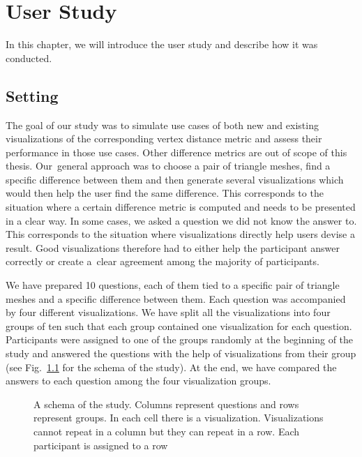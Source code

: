 \chapter{User Study}
\label{chap:user_study}

In this chapter, we will introduce the user study and describe how it was conducted.

\section{Setting}
\label{sec:user_study-setting}

The goal of our study was to simulate use cases of both new and existing visualizations of the corresponding vertex distance metric and assess their performance in those use cases. Other difference metrics are out of scope of this thesis. Our~general approach was to choose a pair of triangle meshes, find a specific difference between them and then generate several visualizations which would then help the user find the same difference. This corresponds to the situation where a certain difference metric is computed and needs to be presented in a clear way. In some cases, we asked a question we did not know the answer to. This corresponds to the situation where visualizations directly help users devise a result. Good visualizations therefore had to either help the participant answer correctly or create a~clear agreement among the majority of participants.

We have prepared 10 questions, each of them tied to a specific pair of triangle meshes and a specific difference between them. Each question was accompanied by four different visualizations. We have split all the visualizations into four groups of ten such that each group contained one visualization for each question. Participants were assigned to one of the groups randomly at the beginning of the study and answered the questions with the help of visualizations from their group (see Fig.~\ref{fig:illustration-study_setting} for the schema of the study). At the end, we have compared the answers to each question among the four visualization groups.

\begin{figure}[h]
	\centering
	\def\svgwidth{\textwidth}
	
	\caption[Study setting]{A schema of the study. Columns represent questions and rows represent groups. In each cell there is a visualization. Visualizations cannot repeat in a column but they can repeat in a row. Each participant is assigned to a row}
	\label{fig:illustration-study_setting}
\end{figure}

